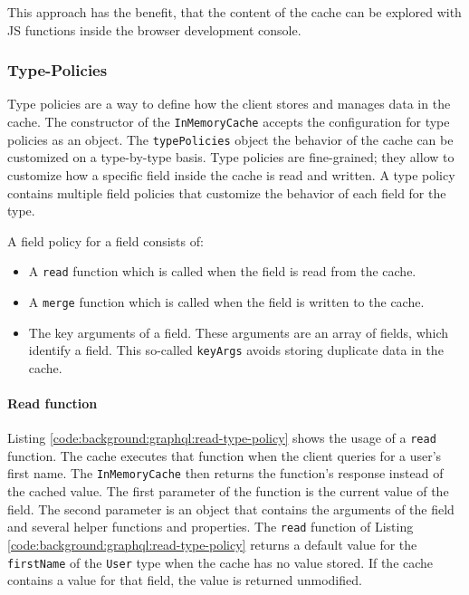 \noindent This approach has the benefit, that the content of the cache can be explored with \ac{JS} functions inside the browser development console.

\subsubsection{Type-Policies}\label{subsubsection:background:graphql:apollo-server-client:type-policies}

Type policies are a way to define how the client stores and manages data in the cache. The constructor of the \texttt{InMemoryCache} accepts the configuration for type policies as an object. The \texttt{typePolicies} object the behavior of the cache can be customized on a type-by-type basis. Type policies are fine-grained; they allow to customize how a specific field inside the cache is read and written. A type policy contains multiple field policies that customize the behavior of each field for the type. \cite{misc:-:background:graphql:apollo-client-cache-reading-writing}

\bigskip

\noindent A field policy for a field consists of: \cite{misc:-:background:graphql:apollo-client-cache-reading-writing}

\begin{itemize}
  \item A \texttt{read} function which is called when the field is read from the cache.
  \item A \texttt{merge} function which is called when the field is written to the cache.
  \item The key arguments of a field. These arguments are an array of fields, which identify a field. This so-called \texttt{keyArgs} avoids storing duplicate data in the cache.
\end{itemize}

\paragraph{Read function}

Listing \ref{code:background:graphql:read-type-policy} shows the usage of a \texttt{read} function. The cache executes that function when the client queries for a user's first name. The \texttt{InMemoryCache} then returns the function's response instead of the cached value. The first parameter of the function is the current value of the field. The second parameter is an object that contains the arguments of the field and several helper functions and properties. \cite{misc:-:background:graphql:apollo-client-cache-reading-writing} The \texttt{read} function of Listing \ref{code:background:graphql:read-type-policy} returns a default value for the \texttt{firstName} of the \texttt{User} type when the cache has no value stored. If the cache contains a value for that field, the value is returned unmodified.

